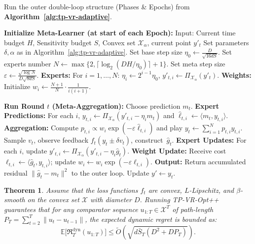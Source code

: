 \documentclass[journal,onecolumn]{IEEEtran}
\newcommand{\cX}{\mathcal{X}}
\theoremstyle{plain}
\newtheorem{theorem}{Theorem}[section]
\theoremstyle{definition}
\theoremstyle{remark}
\newcommand{\regret}{\mathfrak{R}}
\newcommand{\tpvrplusplus}{{\sc TP-VR-Opt++}}
\begin{document}
\begin{algorithm}
    [t]
    \caption{\tpvrplusplus}
    \label{alg:tp-vr-opt-pp}
    \begin{algorithmic}
        [1] \STATE Run the outer double-loop structure (Phases \& Epochs) from \textbf{Algorithm~\ref{alg:tp-vr-adaptive}}.

        \STATE \textbf{Initialize Meta-Learner (at start of each Epoch):} 
        \STATE Input: Current time budget $H$, Sensitivity budget $S$, Convex set $\mathcal{X}_\alpha$, current point $y'_t$
        \STATE Set parameters $\delta, \alpha$ as in Algorithm~\ref{alg:tp-vr-adaptive}.
        \STATE Set base step size $\eta_{0}\leftarrow \frac{D}{\sqrt{16dS}}$.
        \STATE Set experts number
        $N \leftarrow \max\{2, \lceil \log_{2}(DH/\eta_{0}) \rceil + 1\}$. 
        \STATE Set meta step size $\varepsilon \leftarrow \frac{\sqrt{\log N}}{D\sqrt{8dS}}$. 
        \STATE \textbf{Experts:} For $i=1,\dots,N$:
        $\eta_{i}\leftarrow 2^{i-1}\eta_{0}$, $y'_{t,i}\leftarrow \Pi_{\mathcal{X}_\alpha}
        (y'_t)$. 
        \STATE\textbf{Weights:} Initialize $w_{i}\leftarrow \frac{N+1}{N}\cdot\frac{1}{i(i+1)}$.

        \STATE \textbf{Run Round $t$ (Meta-Aggregation):} \STATE \quad Choose
        prediction $m_{t}$. \STATE \quad \textbf{Expert Predictions:} For each
        $i$, $y_{t,i}\leftarrow \Pi_{\mathcal{X}_\alpha}(y'_{t,i}- \eta_{i}m_{t})$
        and $\hat{\ell}_{t,i}\leftarrow \langle m_{t}, y_{t,i}\rangle$. 
        \STATE
        \quad \textbf{Aggregation:} Compute $p_{t,i}\propto w_{i}\exp(-\varepsilon
        \hat{\ell}_{t,i})$ and play $y_{t}\leftarrow \sum_{i=1}^N p_{t,i}y_{t,i}$.
        \STATE \quad Sample $v_{t}$, observe feedback $f_{t}( y_{t}\pm \delta v_{t}
        )$, construct~$\hat{g}_{t}$. \STATE \quad \textbf{Expert Updates:} For
        each $i$, update $y'_{t,i}\leftarrow \Pi_{\mathcal{X}_\alpha}(y'_{t,i}- \eta_{i}
        \hat{g}_{t})$. \STATE \quad \textbf{Weight Update:} Receive cost $\ell_{t,i}
        \leftarrow \langle \hat{g}_{t}, y_{t,i}\rangle$; update
        $w_{i}\leftarrow w_{i}\exp(-\varepsilon \ell_{t,i})$. \STATE \quad \textbf{Output:}
        Return accumulated residual $\|\hat{g}_{t}- m_{t}\|^{2}$ to the outer
        loop. \STATE \quad Update $y' \leftarrow y_{t}$.
    \end{algorithmic}
\end{algorithm}

\begin{theorem}
    \label{thm:tp-vr-opt-pp} Assume that the loss functions $f_{t}$ are convex,
    $L$-Lipschitz, and $\beta$-smooth on the convex set $\cX$ with diameter $D$. Running \tpvrplusplus\,
    guarantees that for any comparator sequence $u_{1:T}\in \cX^T$ of path-length
    $P_{T} = \sum_{t=2}^{T} \|u_{t} - u_{t-1}\|$, the expected dynamic regret is
    bounded as:
    \begin{equation*}
        \mathbb{E}\bigl[\regret_{T}^{\mathrm{dyn}}(u_{1:T})\bigr] \le\widetilde{O}
        \left( \sqrt{d \bar{S}_{T} (D^{2} + D P_{T})}\right).
    \end{equation*}
\end{theorem}
\end{document}
